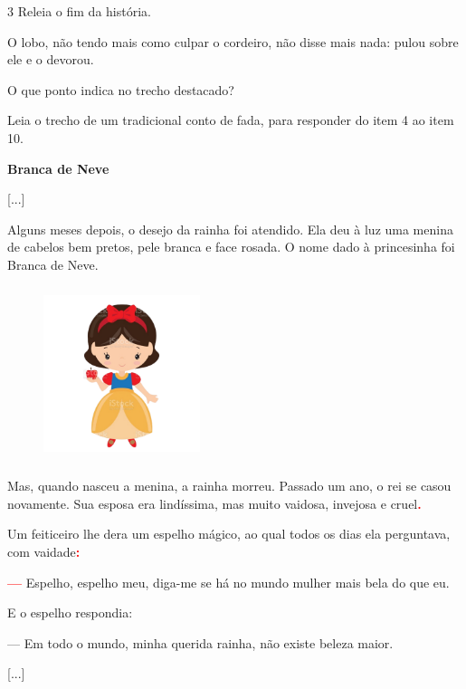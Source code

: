 \pagebreak
\num{3} Releia o fim da história.

\begin{myquote}
O lobo, não tendo mais como culpar o cordeiro, não disse mais nada:
pulou sobre ele e o devorou.
\end{myquote}

O que ponto indica no trecho destacado? 

\num{} Leia o trecho de um tradicional conto de fada, para responder 
do item 4 ao item 10. 



\enlargethispage{3\baselineskip}
\begin{myquote}
\textbf{Branca de Neve}

{[}...{]}

Alguns meses depois, o desejo da rainha foi atendido. Ela deu à luz uma
menina de cabelos bem pretos, pele branca e face rosada. O nome dado à
princesinha foi Branca de Neve.

\begin{figure}
\includegraphics[width=1.8in,height=2in]{./media/image6.png}
\end{figure}

Mas, quando nasceu a menina, a rainha morreu. Passado um ano, o rei se
casou novamente. Sua esposa era lindíssima, mas muito vaidosa, invejosa
e cruel\textcolor{red}{\textbf{.}}

Um feiticeiro lhe dera um espelho mágico, ao qual todos os dias ela
perguntava, com vaidade\textcolor{red}{\textbf{:}}

\textcolor{red}{\textbf{---}} Espelho, espelho meu, diga-me se há no mundo mulher mais bela do que
eu.

E o espelho respondia:

--- Em todo o mundo, minha querida rainha, não existe beleza maior.

{[}...{]}

\end{myquote}
\pagebreak

